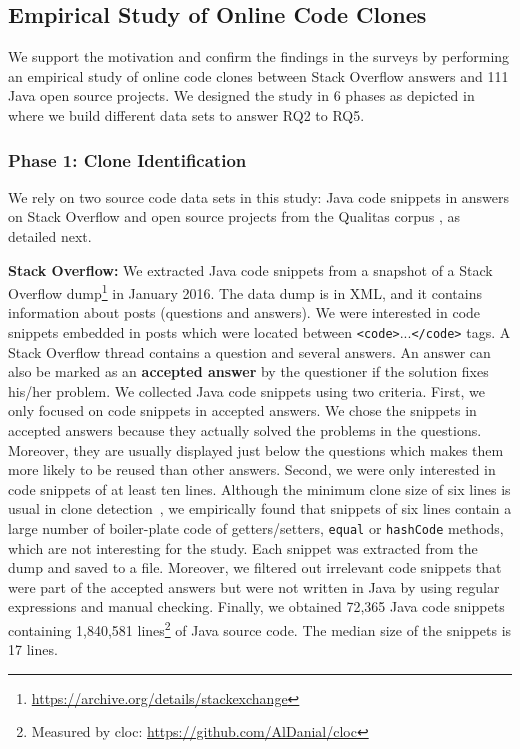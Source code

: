 \documentclass[10pt,journal,compsoc]{IEEEtran}
\begin{document}
\subsection{Empirical Study of Online Code Clones}
We support the motivation and confirm the findings in the surveys by performing
an empirical study of online code clones between Stack Overflow
answers and 111 Java open source projects.
We designed the study in 6 phases as depicted in  where
we build different data sets to answer RQ2 to RQ5. 

\subsubsection{Phase 1: Clone Identification}

We rely on two source code data sets in this study: Java code snippets in answers
on Stack Overflow and open source projects from the Qualitas corpus
\cite{QualitasCorpus}, as detailed next.

\textbf{Stack Overflow:} We extracted Java code snippets from a snapshot of a
Stack Overflow dump\footnote{\url{https://archive.org/details/stackexchange}} in
January 2016. %
The data dump is in XML, and it contains information about posts (questions and
answers). We were interested in code snippets embedded in posts which were
located between {\small\texttt{<code>}...\texttt{</code>}} tags. A Stack
Overflow thread contains a question and several answers. An answer can also be
marked as an \textbf{accepted answer} by the questioner if the solution fixes
his/her problem. We collected Java code snippets using two criteria. First, we
only focused on code snippets in accepted answers. We chose the snippets in
accepted answers because they actually solved the problems in the questions.
Moreover, they are usually displayed just below the questions which makes them
more likely to be reused than other answers. Second, we were only interested in
code snippets of at least ten lines. Although the minimum clone size of six
lines is usual in clone detection~\cite{Bellon2007,Wang2013,Koschke2006}, we
empirically found that snippets of six lines contain a large number of
boiler-plate code of getters/setters, \texttt{equal} or \texttt{hashCode}
methods, which are not interesting for the study. Each snippet was extracted
from the dump and saved to a file. Moreover, we filtered out irrelevant code
snippets that were part of the accepted answers but were not written in Java by
using regular expressions and manual checking.
Finally, we obtained 72,365 Java code snippets containing 1,840,581
lines\footnote{Measured by cloc: \url{https://github.com/AlDanial/cloc}} of Java
source code. The median size of the snippets is 17 lines.
\end{document}
